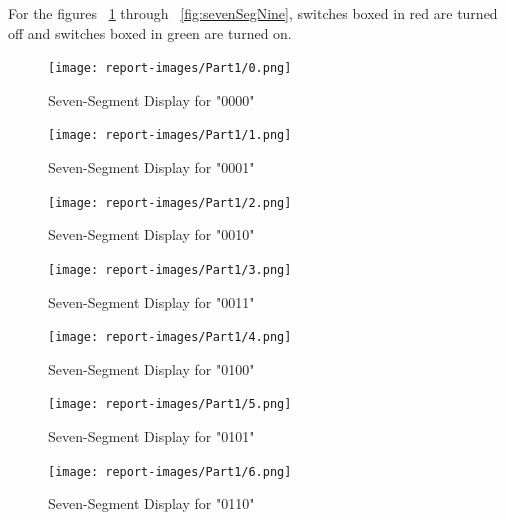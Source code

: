 \documentclass[11pt]{article}
\begin{document}
\begin{center}
	For the figures ~\ref{fig:sevenSegZero} through ~\ref{fig:sevenSegNine}, switches boxed in red are turned off and switches boxed in green are turned on.
\end{center}

\begin{figure}[H]
\begin{center}
\texttt{[image: report-images/Part1/0.png]}
\caption{Seven-Segment Display for "0000"}
\label{fig:sevenSegZero}
\end{center}
\end{figure}

\begin{figure}[H]
\begin{center}
\texttt{[image: report-images/Part1/1.png]}
\caption{Seven-Segment Display for "0001"}
\label{fig:sevenSegOne}
\end{center}
\end{figure}

\begin{figure}[H]
\begin{center}
\texttt{[image: report-images/Part1/2.png]}
\caption{Seven-Segment Display for "0010"}
\label{fig:sevenSegTwo}
\end{center}
\end{figure}

\begin{figure}[H]
\begin{center}
\texttt{[image: report-images/Part1/3.png]}
\caption{Seven-Segment Display for "0011"}
\label{fig:sevenSegThree}
\end{center}
\end{figure}

\begin{figure}[H]
\begin{center}
\texttt{[image: report-images/Part1/4.png]}
\caption{Seven-Segment Display for "0100"}
\label{fig:sevenSegFour}
\end{center}
\end{figure}

\begin{figure}[H]
\begin{center}
\texttt{[image: report-images/Part1/5.png]}
\caption{Seven-Segment Display for "0101"}
\label{fig:sevenSegFive}
\end{center}
\end{figure}

\begin{figure}[H]
\begin{center}
\texttt{[image: report-images/Part1/6.png]}
\caption{Seven-Segment Display for "0110"}
\label{fig:sevenSegSix}
\end{center}
\end{figure}
\end{document}
